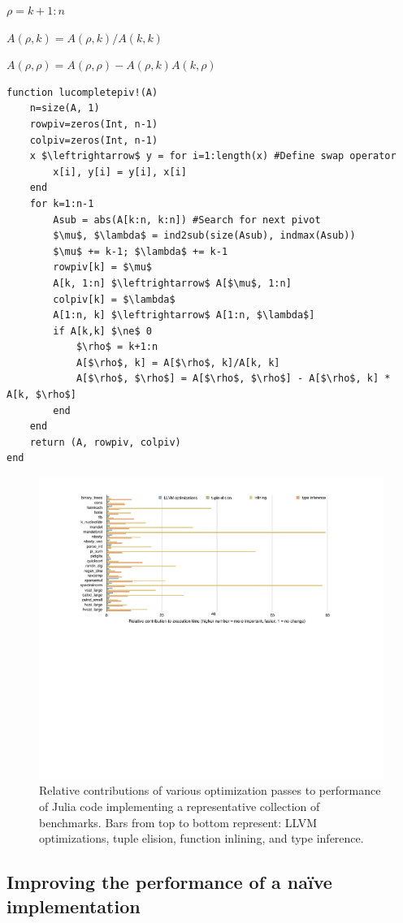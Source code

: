 \begin{algorithm}
\begin{algorithmic}
        $\rho = k+1:n$

        $A(\rho, k) = A(\rho, k)/A(k, k)$

        $A(\rho, \rho) = A(\rho, \rho) - A(\rho, k) A(k, \rho)$
    \EndIf
\EndFor
\end{algorithmic}

\hrulefill

\begin{lstlisting}
function lucompletepiv!(A)
	n=size(A, 1)
	rowpiv=zeros(Int, n-1)
	colpiv=zeros(Int, n-1)
	x $\leftrightarrow$ y = for i=1:length(x) #Define swap operator
		x[i], y[i] = y[i], x[i]
	end
	for k=1:n-1
		Asub = abs(A[k:n, k:n]) #Search for next pivot
		$\mu$, $\lambda$ = ind2sub(size(Asub), indmax(Asub))
		$\mu$ += k-1; $\lambda$ += k-1
		rowpiv[k] = $\mu$
		A[k, 1:n] $\leftrightarrow$ A[$\mu$, 1:n]
		colpiv[k] = $\lambda$
		A[1:n, k] $\leftrightarrow$ A[1:n, $\lambda$]
		if A[k,k] $\ne$ 0
			$\rho$ = k+1:n
			A[$\rho$, k] = A[$\rho$, k]/A[k, k]
			A[$\rho$, $\rho$] = A[$\rho$, $\rho$] - A[$\rho$, k] * A[k, $\rho$]
		end
	end
	return (A, rowpiv, colpiv)
end
\end{lstlisting}

\end{algorithm}


\begin{figure}
	\includegraphics[width=\textwidth]{fig-timings}
	\caption{Relative contributions of various optimization passes to
	performance of Julia code implementing a representative collection
	of benchmarks. Bars from top to bottom represent: LLVM
	optimizations, tuple elision, function inlining, and type inference.}
	\label{fig:timings}
\end{figure}



\subsection{Improving the performance of a na\"ive implementation}


